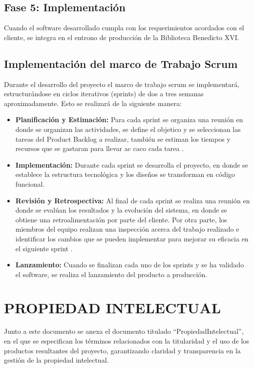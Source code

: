 \documentclass[spanish]{ieee_upb}
\begin{document}
\subsection*{Fase 5: Implementación}

Cuando el software desarrollado cumpla con los requerimientos acordados con el cliente, se integra en el entrono de producción de la Biblioteca Benedicto XVI.

\subsection{Implementación del marco de Trabajo Scrum}
Durante el desarrollo del proyecto el marco de trabajo scrum se implementará, estructurándose en ciclos iterativos (sprints) de dos a tres semanas aproximadamente. Esto se realizará de la siguiente manera:  
\begin{itemize}
    \item \textbf{Planificación y Estimación:} Para cada sprint se organiza una reunión en donde se organizan las actividades, se define el objetico y se seleccionan las tareas del Product Backlog a realizar, también se estiman los tiempos y recursos que se gastaran para llevar ac caco cada tarea \cite{Cohn2005}.
    \item \textbf{Implementación:} Durante cada sprint se desarrolla el proyecto, en donde se establece la estructura tecnológica y los diseños se transforman en código funcional.
    \item \textbf{Revisión y Retrospectiva:} Al final de cada sprint se realiza una reunión en donde se evalúan los resultados y la evolución del sistema, en donde se obtiene una retroalimentación por parte del cliente. Por otra parte, los miembros del equipo realizan una inspección acerca del trabajo realizado e identificar los cambios que se pueden implementar para mejorar su eficacia en el siguiente sprint \cite{schwaber2020guia}.
    \item \textbf{Lanzamiento:} Cuando se finalizan cada uno de los sprints y se ha validado el software, se realiza el lanzamiento del producto a producción. 
\end{itemize}

\newpage
\section{PROPIEDAD INTELECTUAL}
Junto a este documento se anexa el documento titulado “PropiedadIntelectual”, en el que se especifican los términos relacionados con la titularidad y el uso de los productos resultantes del proyecto, garantizando claridad y transparencia en la gestión de la propiedad intelectual. 
\vspace{0.3 cm}
\end{document}
